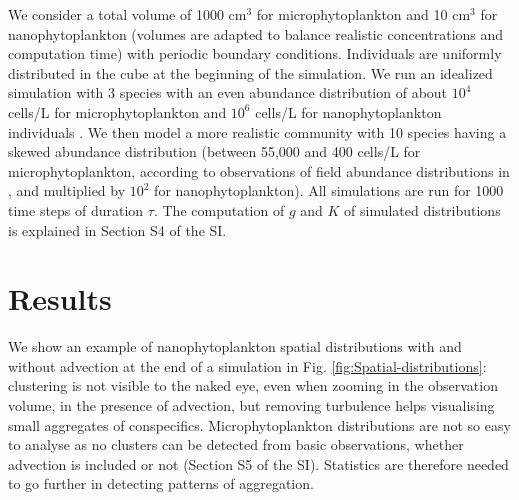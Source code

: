 \documentclass[english]{article}
\begin{document}
\medskip{}

We consider a total volume of 1000 cm$^{3}$ for microphytoplankton
and 10 cm$^{3}$ for nanophytoplankton (volumes are adapted to balance
realistic concentrations and computation time) with periodic boundary
conditions. Individuals are uniformly distributed in the cube at the
beginning of the simulation. We run an idealized simulation with 3
species with an even abundance distribution of about $10^{4}$ cells/L
for microphytoplankton \citep{picoche_strong_2020} and $10^{6}$
cells/L for nanophytoplankton individuals \citep{edwards_mixotrophy_2019}.
We then model a more realistic community with 10 species having a
skewed abundance distribution (between 55,000 and 400 cells/L for
microphytoplankton, according to observations of field abundance distributions
in \citealp{picoche_strong_2020}, and multiplied by $10^{2}$ for
nanophytoplankton). All simulations are run for 1000 time steps of
duration $\tau$. The computation of $g$ and $K$ of simulated distributions
is explained in Section S4 of the SI.

\section*{Results}

We show an example of nanophytoplankton spatial distributions with
and without advection at the end of a simulation in Fig. \ref{fig:Spatial-distributions}:
clustering is not visible to the naked eye, even when zooming in the
observation volume, in the presence of advection, but removing turbulence
helps visualising small aggregates of conspecifics. Microphytoplankton
distributions are not so easy to analyse as no clusters can be detected
from basic observations, whether advection is included or not (Section
S5 of the SI). Statistics are therefore needed to go further in detecting
patterns of aggregation.
\end{document}
